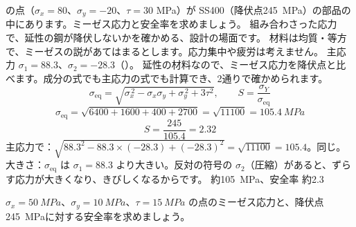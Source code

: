 \begin{phreidai}[ミーゼス応力で安全率を確かめる]
\label{ph:力-9:ex5}の点（$\sigma_x=80$、$\sigma_y=-20$、$\tau=30$ MPa）が SS400（降伏点\qty{245}{MPa}）の部品の中にあります。ミーゼス応力と安全率を求めましょう。
\phbamen
組み合わさった応力で、延性の鋼が降伏しないかを確かめる、設計の場面です。
\phmushi
材料は均質・等方で、ミーゼスの説があてはまるとします。応力集中や疲労は考えません。
\phzu
主応力 $\sigma_1=88.3$、$\sigma_2=-28.3$（）。
\phriyu
延性の材料なので、ミーゼス応力を降伏点と比べます。成分の式でも主応力の式でも計算でき、2通りで確かめられます。
\phtateru
\[\sigma_{\mathrm{eq}}=\sqrt{\sigma_x^{\,2}-\sigma_x\sigma_y+\sigma_y^{\,2}+3\tau^2},\qquad S=\frac{\sigma_Y}{\sigma_{\mathrm{eq}}}\]
\phtoku
\[\sigma_{\mathrm{eq}}=\sqrt{6400+1600+400+2700}=\sqrt{\num{11100}}=\qty{105.4}{MPa}\]
\[S=\frac{245}{105.4}=2.32\]
\phtashikame
主応力で：$\sqrt{88.3^2-88.3\times(-28.3)+(-28.3)^2}=\sqrt{\num{11100}}=105.4$。同じ。\\
大きさ：$\sigma_{\mathrm{eq}}$ は $\sigma_1=88.3$ より大きい。反対の符号の $\sigma_2$（圧縮）があると、ずらす応力が大きくなり、きびしくなるからです。
\kotae 約\qty{105}{MPa}、安全率 約2.3
\end{phreidai}
\begin{jibun}
$\sigma_x=\qty{50}{MPa}$、$\sigma_y=\qty{10}{MPa}$、$\tau=\qty{15}{MPa}$ の点のミーゼス応力と、降伏点\qty{245}{MPa}に対する安全率を求めましょう。
\end{jibun}

